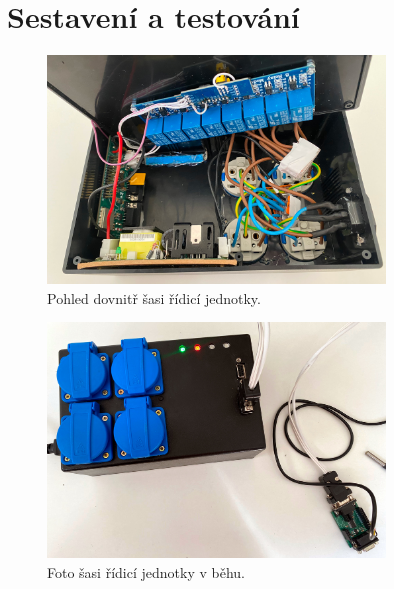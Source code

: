 \chapter{Sestavení a testování}

\begin{figure}[h!]
    \centering
    \includegraphics[width=0.8\textwidth]{obrazky/foto/ulozeni.jpeg}
    \caption{Pohled dovnitř šasi řídicí jednotky.}
    \label{fig:obrazky-foto-ulozeni-jpeg}
\end{figure}

\begin{figure}[h!]
    \centering
    \includegraphics[width=0.8\textwidth]{obrazky/foto/zarizeni_beh.jpeg}
    \caption{Foto šasi řídicí jednotky v běhu.}
    \label{fig:obrazky-foto-zarizeni_beh-jpeg}
\end{figure}

